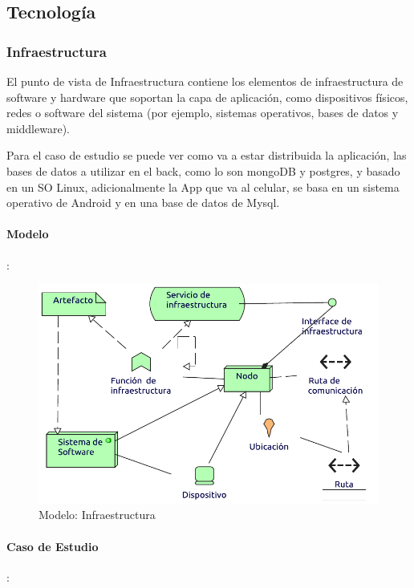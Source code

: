\subsection{Tecnología}

\subsubsection{Infraestructura}
El punto de vista de Infraestructura contiene los elementos de infraestructura de software y hardware que soportan la capa de aplicación, como dispositivos físicos, redes o software del sistema (por ejemplo, sistemas operativos, bases de datos y middleware).  \vspace{\baselineskip}

Para el caso de estudio se puede ver como va a estar distribuida la aplicación, las bases de datos a utilizar en el back, como lo son mongoDB y postgres, y basado en un SO Linux, adicionalmente la App que va al celular, se basa en un sistema operativo de Android y en una base de datos de Mysql.

\paragraph{Modelo}:
\begin{figure}[h!]
	\centering
	\includegraphics[width=0.8\linewidth]{Desarrollo/ArquitecturaEmpresarial/Tecnologia/imgs/insfraestructuraMetamodelo.pdf}
	\caption{Modelo: Infraestructura}
\end{figure}
\newpage
\paragraph{Caso de Estudio}:

